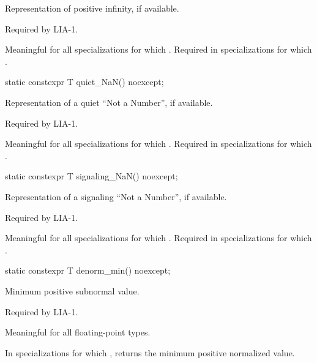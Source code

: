 \begin{itemdescr}
\pnum
Representation of positive infinity, if available.
\begin{footnote}
Required by LIA-1.
\end{footnote}

\pnum
Meaningful for all specializations for which
.
Required in specializations for which
.
\end{itemdescr}

%
\begin{itemdecl}
static constexpr T quiet_NaN() noexcept;
\end{itemdecl}

\begin{itemdescr}
\pnum
Representation of a quiet ``Not a Number'', if available.
\begin{footnote}
Required by LIA-1.
\end{footnote}

\pnum
Meaningful for all specializations for which
.
Required in specializations for which
.
\end{itemdescr}

%
\begin{itemdecl}
static constexpr T signaling_NaN() noexcept;
\end{itemdecl}

\begin{itemdescr}
\pnum
Representation of a signaling ``Not a Number'', if available.
\begin{footnote}
Required by LIA-1.
\end{footnote}

\pnum
Meaningful for all specializations for which
.
Required in specializations for which
.
\end{itemdescr}

%
\begin{itemdecl}
static constexpr T denorm_min() noexcept;
\end{itemdecl}

\begin{itemdescr}
%
\pnum
Minimum positive subnormal value.
\begin{footnote}
Required by LIA-1.
\end{footnote}

\pnum
Meaningful for all floating-point types.

\pnum
In specializations for which
,
returns the minimum positive normalized value.
\end{itemdescr}

